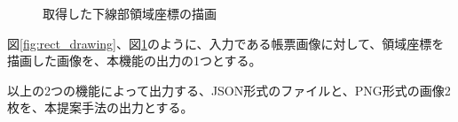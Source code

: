 \begin{figure}[t]
    \begin{center}
        \caption{取得した下線部領域座標の描画}
        \label{fig:underline_drawing}
    \end{center}
\end{figure}

図\ref{fig:rect_drawing}、図\ref{fig:underline_drawing}のように、入力である帳票画像に対して、領域座標を描画した画像を、本機能の出力の1つとする。

以上の2つの機能によって出力する、JSON形式のファイルと、PNG形式の画像2枚を、本提案手法の出力とする。
